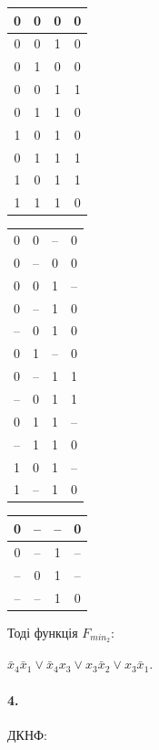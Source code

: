 \documentclass[12pt]{extarticle}
\begin{document}
\begin{center}
    \begin{tabular}{ c  c  c  c  }
    0 & 0 & 0 & 0 \\
    \hline
    0 & 0 & 1 & 0 \\
    0 & 1 & 0 & 0 \\
    \hline
    0 & 0 & 1 & 1 \\
    0 & 1 & 1 & 0 \\
    1 & 0 & 1 & 0 \\
    \hline
    0 & 1 & 1 & 1 \\
    1 & 0 & 1 & 1 \\
    1 & 1 & 1 & 0 \\
    \end{tabular}
    \hspace{1cm}
    \begin{tabular}{ c  c  c  c  }
    0 & 0 & -- & 0 \\
    0 & -- & 0 & 0 \\
    \hline
    0 & 0 & 1 & -- \\
    0 & -- & 1 & 0 \\
    -- & 0 & 1 & 0 \\
    0 & 1 & -- & 0 \\
    \hline
    0 & -- & 1 & 1 \\
    -- & 0 & 1 & 1 \\
    0 & 1 & 1 & -- \\
    -- & 1 & 1 & 0 \\
    1 & 0 & 1 & -- \\
    1 & -- & 1 & 0 \\
    \end{tabular}
    \hspace{1cm}
    \begin{tabular}{ c  c  c  c  }
    0 & -- & -- & 0 \\
    \hline
    0 & -- & 1 & -- \\
    -- & 0 & 1 & -- \\
    -- & -- & 1 & 0 \\
    \end{tabular}
\end{center}
Тоді функція $F_{min_2}$:

$ \bar x_4 \bar x_1 \lor 
  \bar x_4 x_3 \lor 
   x_3 \bar x_2 \lor 
   x_3 \bar x_1. $

\paragraph{4.}
ДКНФ:
\end{document}

